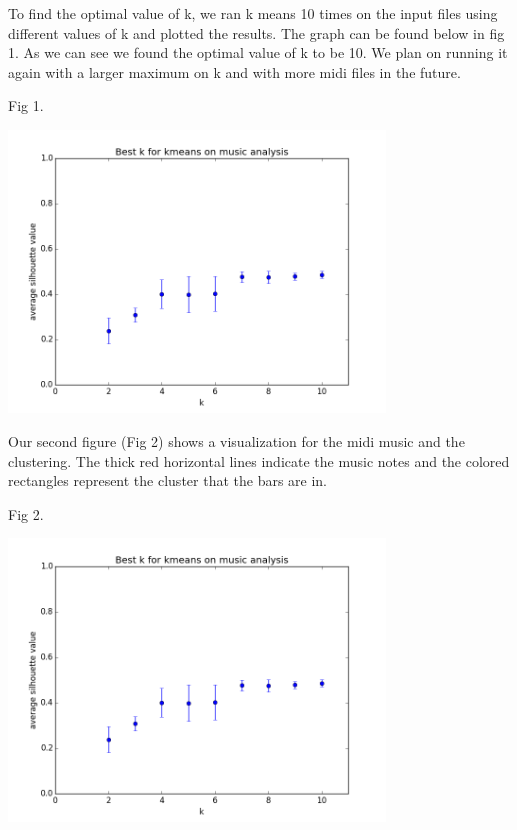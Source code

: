 \documentclass[a4paper, 12pt]{article}
\begin{document}
To find the optimal value of k, we ran k means 10 times on the input files using  
different values of k and plotted the results. The graph can be found below in fig 1. As we can see we found the optimal value of k to be 10. We plan on running it again with a larger maximum on k and with more midi files in the future.

Fig 1.
\centerline{\includegraphics[width=10cm]{best_k_song_2.png}}

Our second figure (Fig 2) shows a visualization for the midi music and the clustering. The thick red horizontal lines indicate the music notes and the colored rectangles represent the cluster that the bars are in.

Fig 2.
\centerline{\includegraphics[width=10cm]{best_k_song_2.png}}
\end{document}

